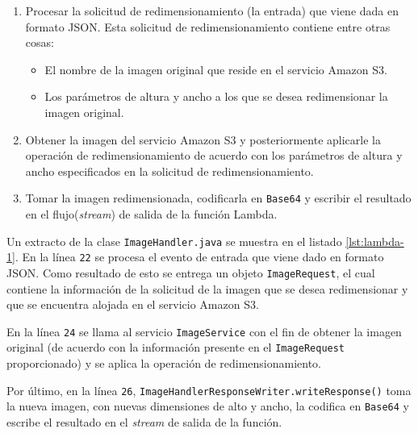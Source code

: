 \begin{enumerate}
    \item Procesar la solicitud de redimensionamiento (la entrada) que viene dada en formato JSON. Esta solicitud de redimensionamiento contiene entre otras cosas:
    \begin{itemize}
        \item El nombre de la imagen original que reside en el servicio Amazon S3.
        \item Los parámetros de altura y ancho a los que se desea redimensionar la imagen original.
    \end{itemize}
    \item Obtener la imagen del servicio Amazon S3 y posteriormente aplicarle la operación de redimensionamiento de acuerdo con los parámetros de altura y ancho especificados en la solicitud de redimensionamiento.
    \item Tomar la imagen redimensionada, codificarla en \texttt{Base64} y escribir el resultado en el flujo(\emph{stream}) de salida de la función Lambda.
\end{enumerate}
 
Un extracto de la clase \texttt{ImageHandler.java} se muestra en el listado \ref{lst:lambda-1}. En la línea \texttt{22} se procesa el evento de entrada que viene dado en formato JSON. Como resultado de esto se entrega un objeto \texttt{ImageRequest}, el cual contiene la información de la solicitud de la imagen que se desea redimensionar y que se encuentra alojada en el servicio Amazon S3.

En la línea \texttt{24} se llama al servicio \texttt{ImageService} con el fin de obtener la imagen   original (de acuerdo con la información presente en el \texttt{ImageRequest} proporcionado) y se aplica la operación de redimensionamiento.

Por último, en la línea \texttt{26}, \texttt{ImageHandlerResponseWriter.writeResponse()} toma la nueva imagen, con nuevas dimensiones de alto y ancho, la codifica en \texttt{Base64} y escribe el resultado en el \emph{stream} de salida de la función. 

